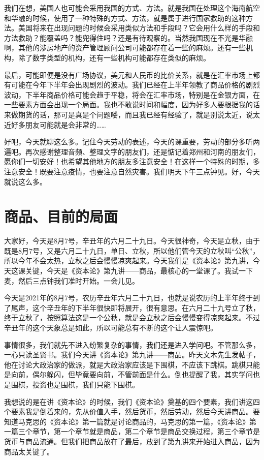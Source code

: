 \documentclass[UTF8, 12pt, a4paper]{ctexrep}
\begin{document}
我们在想，美国人也可能会采用我国的方式、方法。就是我国在处理这个海南航空和华融的时候，使用了一种特殊的方式、方法，就是属于进行国家救助的这种方法。美国将来在出现问题的时候会采用类似方法和手段吗？它会用什么样的手段和方法救助？能覆盖吗？能兜得住吗？还是有待观察的。当然我国现在不光是华融啊，其他的涉房地产的资产管理顾问公司可能都存在着一些的麻烦。还有一些机构，除了数字类型的机构，还有一些机构可能都存在类似的麻烦。

最后，可能即便是没有广场协议，美元和人民币的比价关系，就是在汇率市场上都有可能在今年下半年会出现剧烈的波动。我们已经在上半年领教了商品价格的剧烈波动，下半年商品价格可能会趋于平稳，将会在汇率市场，特别是在金银方面，在一些要素方面会出现一个局面。我也不敢说时间和幅度，因为好多人要根据我的话来做期货的话，那可是真是个问题喽，而且我已经有经验了，就是别说太近，说太近好多朋友可能就是会非常的……

好吧，今天就聊这么多。记住今天劳动的表述，今天的课重要，劳动的部分多听两遍吧。再次感谢整理音频、整理文字的朋友们，还是惦记着郑州和河南的朋友们，愿你们一切安好！也希望其他地方的朋友多注意安全！在这样一个特殊的时期，多注意安全！既要注意疫情，也要注意自然灾害。我们明天下午三点钟见。好，今天就说这么多。

\section{商品、目前的局面}

大家好，今天是8月7号，辛丑年的六月二十九日。今天很神奇，今天是立秋，由于既是8月7号，又是六月二十九日，单日、立秋，所以他们管今天的立秋叫“公秋”，所以今年不会太热，立秋之后会慢慢凉爽起来。今天我们是《资本论》第九讲，今天这课关键，今天是《资本论》第九讲——商品，最核心的一堂课了。我试一下麦，然后三点钟我们准时开始。一会儿见。

今天是2021年的8月7号，农历辛丑年六月二十九日，也就是说农历的上半年终于到了尾声，这个辛丑年的下半年很快即将展开，很有意思。在六月二十九号立了秋，终于立秋了，按照算法这是一个公秋，就是会立秋之后会慢慢变得凉爽起来。不过辛丑年的这个天象总是如此，所以可能总有不断的这个让人震惊吧。

事情很多，我们就先不进入纷繁复杂的事情，我们还是进入学问吧。不管那么多，一心只读圣贤书。我们今天讲《资本论》第九讲——商品。昨天文木先生发帖子，他在讨论大政治家的做派，就是大政治家应该是下围棋，不应该下跳棋。跳棋只能是向前，偶尔躲闪，但毕竟要向前，不管前面是什么。倒也提醒了我，其实学问也是围棋，投资也是围棋，我们只能下围棋。

我想说的是在讲《资本论》的时候，我们《资本论》奠基的四个要素，我们讲这四个要素我是倒着来的，先从价值入手，然后货币，然后劳动，然后今天讲商品。要知道马克思的《资本论》第一篇就是讨论商品的，马克思的第一篇，《资本论》第一篇三个章节，第一个章节就是商品，第二个章节是商品交换过程，第三个章节是货币与商品流通。但我们把商品放在了最后，放到了第九讲来开始进入商品，因为商品太关键了。
\end{document}
